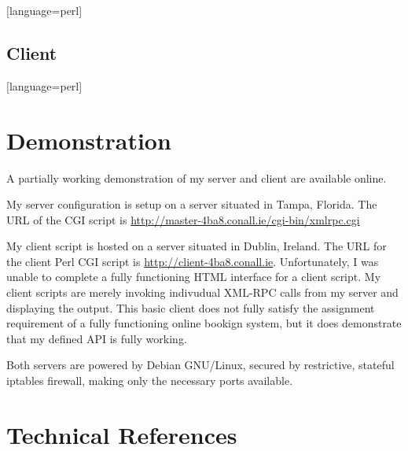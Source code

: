 \documentclass[a4paper,10pt]{article}
\begin{document}
\lstset{breaklines=true,tabsize=3,basicstyle=\ttfamily}
[language=perl]

\subsection{Client}

\lstset{breaklines=true,tabsize=3,basicstyle=\ttfamily}
[language=perl]

\section{Demonstration}

A partially working demonstration of my server and client are available online.


My server configuration is setup on a server situated in Tampa, Florida.
The URL of the CGI script is
\url{http://master-4ba8.conall.ie/cgi-bin/xmlrpc.cgi}


My client script is hosted on a server situated in Dublin, Ireland. The
URL for the client Perl CGI script is
\url{http://client-4ba8.conall.ie}. Unfortunately, I was unable to
complete a fully functioning HTML interface for a client script. My
client scripts are merely invoking indivudual XML-RPC calls from my
server and displaying the output. This basic client does not fully
satisfy the assignment requirement of a fully functioning online bookign
system, but it does demonstrate that my defined API is fully working.


Both servers are powered by Debian GNU/Linux, secured by restrictive, 
stateful iptables firewall, making only the necessary ports available.

\section{Technical References}
\end{document}
